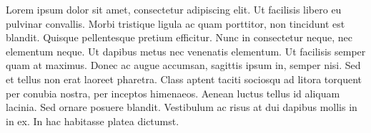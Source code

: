 Lorem ipsum dolor sit amet, consectetur adipiscing elit. Ut facilisis libero eu pulvinar convallis. Morbi tristique ligula ac quam porttitor, non tincidunt est blandit. Quisque pellentesque pretium efficitur. Nunc in consectetur neque, nec elementum neque. Ut dapibus metus nec venenatis elementum. Ut facilisis semper quam at maximus. Donec ac augue accumsan, sagittis ipsum in, semper nisi. Sed et tellus non erat laoreet pharetra. Class aptent taciti sociosqu ad litora torquent per conubia nostra, per inceptos himenaeos. Aenean luctus tellus id aliquam lacinia. Sed ornare posuere blandit. Vestibulum ac risus at dui dapibus mollis in in ex. In hac habitasse platea dictumst. 
